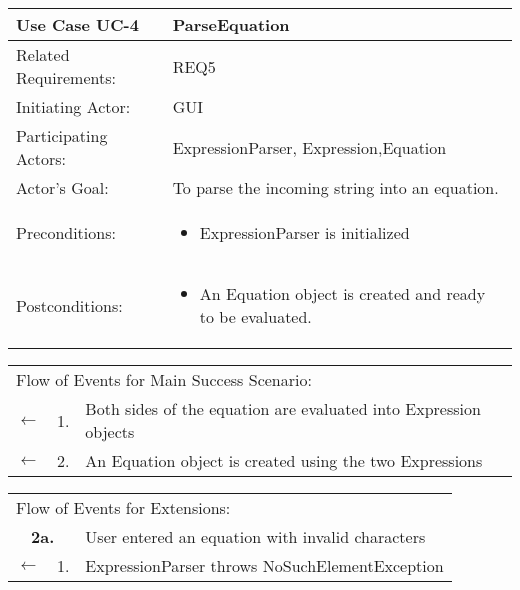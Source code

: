 \documentclass[11pt]{article}
\begin{document}
\newpage
\begin{center}
\begin{tabular}{p{1.5in}p{5in}}
\hline
\textbf{Use Case UC-4}     & \textbf{ParseEquation} \\ \hline
Related Requirements: & REQ5 \\
Initiating Actor:     & GUI \\
Participating Actors: & ExpressionParser, Expression,Equation \\
Actor's Goal:          & To parse the incoming string into an equation. \\
Preconditions:         & \begin{itemize}[nosep]
		      \item  ExpressionParser is initialized
                         \end{itemize} \\
Postconditions:        & \begin{itemize}[nosep]
                         \item An Equation object is created and ready to be evaluated.
                         \end{itemize} \\ \hline
\end{tabular}

\begin{tabular}{p{.25in}p{.25in}p{5.8in}}
\multicolumn{3}{l}{Flow of Events for Main Success Scenario:} \\
$\leftarrow$  & 1. & Both sides of the equation are evaluated into Expression objects\\
$\leftarrow$  & 2. & An Equation object is created using the two Expressions\\
\end{tabular}

\begin{tabular}{p{.25in}p{.25in}p{5.8in}}
\multicolumn{3}{l}{Flow of Events for Extensions:} \\
\multicolumn{2}{c}{\textbf{2a.}} & User entered an equation with invalid characters \\
$\leftarrow$  & 1.           & ExpressionParser throws NoSuchElementException\\


\end{tabular}
\end{center}
\end{document}
